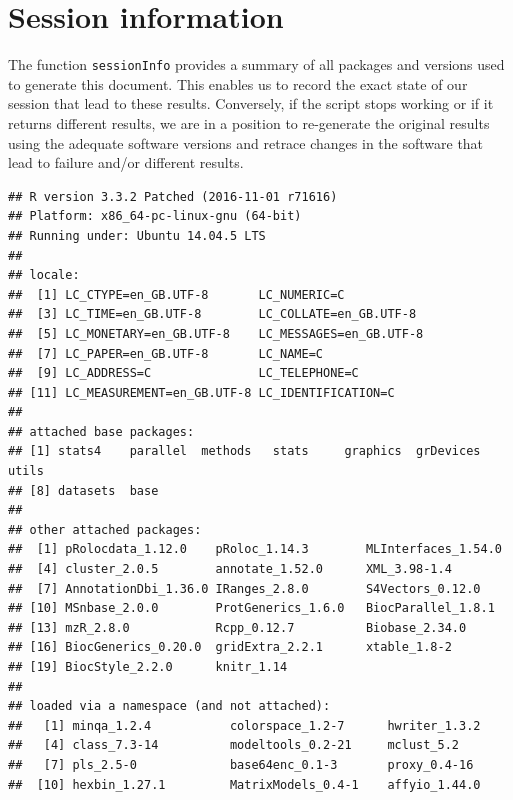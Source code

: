 \section*{Session information}

The function \texttt{sessionInfo} provides a summary of all packages
and versions used to generate this document. This enables us to record
the exact state of our session that lead to these results. Conversely,
if the script stops working or if it returns different results, we are
in a position to re-generate the original results using the adequate
software versions and retrace changes in the software that lead to
failure and/or different results.

\begin{knitrout}
\color{fgcolor}\begin{kframe}
\begin{alltt}
\hlstd{()}
\end{alltt}
\begin{verbatim}
## R version 3.3.2 Patched (2016-11-01 r71616)
## Platform: x86_64-pc-linux-gnu (64-bit)
## Running under: Ubuntu 14.04.5 LTS
## 
## locale:
##  [1] LC_CTYPE=en_GB.UTF-8       LC_NUMERIC=C              
##  [3] LC_TIME=en_GB.UTF-8        LC_COLLATE=en_GB.UTF-8    
##  [5] LC_MONETARY=en_GB.UTF-8    LC_MESSAGES=en_GB.UTF-8   
##  [7] LC_PAPER=en_GB.UTF-8       LC_NAME=C                 
##  [9] LC_ADDRESS=C               LC_TELEPHONE=C            
## [11] LC_MEASUREMENT=en_GB.UTF-8 LC_IDENTIFICATION=C       
## 
## attached base packages:
## [1] stats4    parallel  methods   stats     graphics  grDevices utils    
## [8] datasets  base     
## 
## other attached packages:
##  [1] pRolocdata_1.12.0    pRoloc_1.14.3        MLInterfaces_1.54.0 
##  [4] cluster_2.0.5        annotate_1.52.0      XML_3.98-1.4        
##  [7] AnnotationDbi_1.36.0 IRanges_2.8.0        S4Vectors_0.12.0    
## [10] MSnbase_2.0.0        ProtGenerics_1.6.0   BiocParallel_1.8.1  
## [13] mzR_2.8.0            Rcpp_0.12.7          Biobase_2.34.0      
## [16] BiocGenerics_0.20.0  gridExtra_2.2.1      xtable_1.8-2        
## [19] BiocStyle_2.2.0      knitr_1.14          
## 
## loaded via a namespace (and not attached):
##   [1] minqa_1.2.4           colorspace_1.2-7      hwriter_1.3.2        
##   [4] class_7.3-14          modeltools_0.2-21     mclust_5.2           
##   [7] pls_2.5-0             base64enc_0.1-3       proxy_0.4-16         
##  [10] hexbin_1.27.1         MatrixModels_0.4-1    affyio_1.44.0        

\end{verbatim}
\end{kframe}
\end{knitrout}
